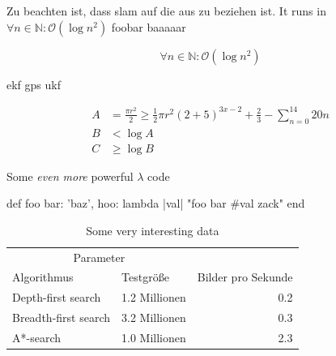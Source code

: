 \documentclass{thesis}
\begin{document}
Zu beachten ist, dass \gls{slam} auf die  aus  zu beziehen ist. It runs \cite{patrick_rothfuss_name_2012} in \( \forall n \in \mathbb{N}: \mathcal{O}(\log n^2) \) foobar \cite{patrick_rothfuss_furcht_2011} baaaaar \cite{patrick_rothfuss_furcht_2012}

\[
\forall n \in \mathbb{N}: \mathcal{O}(\log n^2)
\]

\gls{ekf} \gls{gps} \gls{ukf}

\begin{align}
  A & = \frac{\pi r^2}{2} \geq \frac{1}{2} \pi r^2 (2 + 5)^{3x - 2} + \frac{2}{3} - \sum_{n=0}^{14}{20n}\\
  B & < \log A\\
  C & \geq \log B
\end{align}

\blindtext

\begin{listing}
  \caption{Some \emph{even more} powerful $\lambda$ code}
  \begin{rubycode}
def foo
  { bar: 'baz', hoo: lambda { |val| "foo bar #{val} zack" } }
end
  \end{rubycode}
\end{listing}

\blindtext

\begin{table}
  \caption{Some very interesting data}
  \center
  \begin{tabular}{l l r}
  \toprule
  \multicolumn{2}{c}{Parameter}\\
  \cmidrule{1-2}
  Algorithmus & Testgröße & Bilder pro Sekunde\\
  \midrule
  Depth-first search & 1.2 Millionen & 0.2\\
  \addlinespace
  Breadth-first search & 3.2 Millionen & 0.3\\
  \addlinespace
  A*-search & 1.0 Millionen & 2.3\\
  \bottomrule
  \end{tabular}
\end{table}

\Blinddocument
\end{document}

